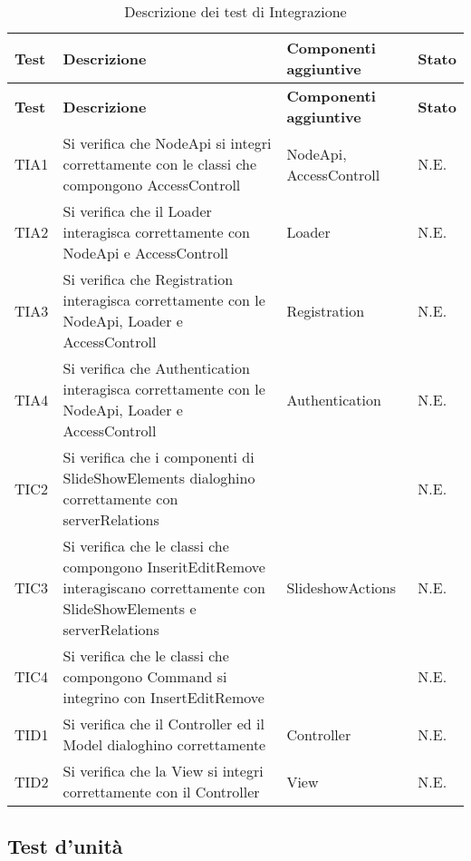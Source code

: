 {{	\begin{longtable} [c]{| p{2cm} | p{6cm} |p{3cm} | p{2cm} |}
			\caption{Descrizione dei test di Integrazione \label{tab:verReqInteg}}\\
		 \hline
		 \textbf{Test} & \textbf{Descrizione} & \textbf{Componenti aggiuntive}& \textbf{Stato} \\
		 \hline
		 \endfirsthead
		 \hline
		 \textbf{Test} & \textbf{Descrizione} & \textbf{Componenti aggiuntive}& \textbf{Stato} \\
		 \hline
			\endhead
		 \hline
		 \endfoot
		 \hline
		 \endlastfoot
			TIA1 & Si verifica che NodeApi si integri correttamente con le classi che compongono AccessControll & NodeApi, AccessControll & N.E.\\
			\hline
			TIA2 & Si verifica che il Loader interagisca correttamente con NodeApi e AccessControll  & Loader & N.E.\\
			\hline
			TIA3 & Si verifica che Registration interagisca correttamente con le NodeApi, Loader e AccessControll & Registration & N.E.\\
			\hline
			TIA4 & Si verifica che Authentication interagisca correttamente con le NodeApi, Loader e AccessControll & Authentication & N.E.\\
			\hline
			TIC2 & Si verifica che i componenti di SlideShowElements dialoghino correttamente con serverRelations &  & N.E.\\
			\hline
			TIC3 & Si verifica che le classi che compongono InseritEditRemove interagiscano correttamente con SlideShowElements e serverRelations & SlideshowActions & N.E.\\
			\hline
			TIC4 & Si verifica che le classi che compongono Command si integrino con InsertEditRemove &  & N.E.\\
			\hline
			TID1 & Si verifica che il Controller  ed il Model dialoghino correttamente & Controller & N.E.\\
			\hline
			TID2 & Si verifica che la View si integri correttamente con il Controller & View & N.E.\\
		\end{longtable}
}
}
\newpage
\subsection{Test d'unità}
		

